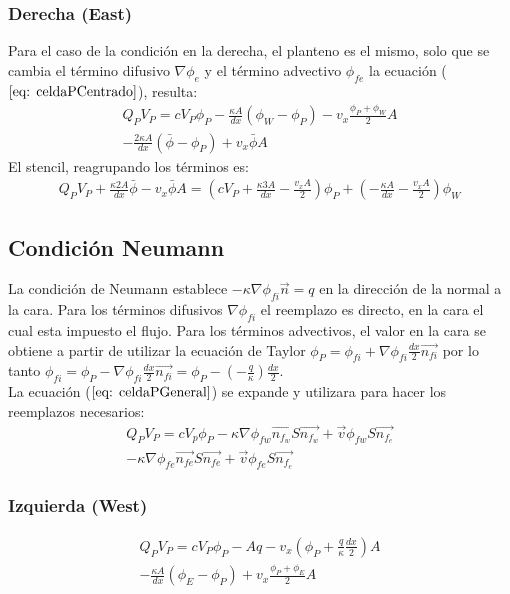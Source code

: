 \documentclass{article}
\begin{document}
    \subsubsection{Derecha (East)}   
        Para el caso de la condición en la derecha, el planteno es el mismo, solo que se cambia el término difusivo $\nabla \phi_e$  y el término advectivo $\phi_{fe}$ la ecuación ($\ref{eq: celdaPCentrado}$), resulta:
        \begin{multline*}
    	    Q_P V_P = c  V_P \phi_P - \frac{\kappa A}{dx} \left( \phi_W - \phi_P \right) - v_x \frac{\phi_P +  \phi_W}{2} A \\ 
    	        - \frac{2 \kappa A}{dx} \left( \bar{\phi} - \phi_P \right) + v_x \bar{\phi} A
        \end{multline*}
       El stencil, reagrupando los términos es: 
        \begin{multline}
    	    Q_P V_P + \frac{\kappa 2 A}{dx} \bar{\phi} - v_x \bar{\phi} A = (c  V_P  + \frac{\kappa 3 A}{dx} - \frac{v_x A}{2}) \phi_P 
    	    + ( -\frac{\kappa A}{dx} - \frac{v_x A}{2}) \phi_W
    	    \label{eq:stencilDirE}
        \end{multline}
    \subsection{Condición Neumann}
        La condición de Neumann establece $-\kappa \nabla \phi_{fi} \vec{n} = \textit{q}$ en la dirección de la normal a la cara. Para los términos difusivos $\nabla \phi_{fi}$ el reemplazo es directo, en la cara el cual esta impuesto el flujo. Para los términos advectivos, el valor en la cara se obtiene a partir de utilizar la ecuación de Taylor $\phi_P = \phi_{fi} + \nabla \phi_{fi} \frac{dx}{2} \vec{n_{fi}}$ por lo tanto  $\phi_{fi} = \phi_P - \nabla \phi_{fi} \frac{dx}{2} \vec{n_{fi}} = \phi_P - (-\frac{q}{\kappa}) \frac{dx}{2}$. 
       \\ 
       La ecuación ($\ref{eq: celdaPGeneral}$) se expande y utilizara para hacer los reemplazos necesarios:
     \begin{multline*}
        Q_P V_P = c V_p\phi_P  - \kappa \nabla \phi_{fw}   \vec{n_{f_w}} S \vec{n_{f_w}} + \vec{v}\phi_{fw} S \vec{n_{f_e}} \\
        - \kappa \nabla \phi_{fe} \vec{n_{fe}} S \vec{n_{fe}} + \vec{v}\phi_{fe} S \vec{n_{f_e}}
    \end{multline*}   
        \subsubsection{Izquierda (West)}
        \begin{multline*}
    	    Q_P V_P = c  V_P \phi_P - A q - v_x 
    	    (\phi_P  +  \frac{q}{\kappa} \frac{dx}{2})A \\ 
    	        - \frac{\kappa A}{dx} \left( \phi_E - \phi_P \right) + v_x \frac{\phi_P +  \phi_E}{2} A
        \end{multline*}
        
\end{document}
